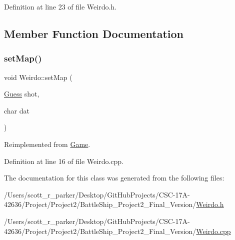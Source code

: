 Definition at line 23 of file Weirdo.\+h.



\subsection{Member Function Documentation}
\mbox{\label{class_weirdo_aa71d633becb93a3d1b6273f5b0a8dc14}} 
\subsubsection{\texorpdfstring{set\+Map()}{setMap()}}
{\footnotesize\ttfamily void Weirdo\+::set\+Map (\begin{DoxyParamCaption}\item[{\hyperlink{class_guess}{Guess}}]{shot,  }\item[{char}]{dat }\end{DoxyParamCaption})\hspace{0.3cm}{\ttfamily [virtual]}}



Reimplemented from \hyperlink{class_game_a4e23ede628f25d35813322e4e3f46b01}{Game}.



Definition at line 16 of file Weirdo.\+cpp.



The documentation for this class was generated from the following files\+:\begin{DoxyCompactItemize}
\item 
/\+Users/scott\+\_\+r\+\_\+parker/\+Desktop/\+Git\+Hub\+Projects/\+C\+S\+C-\/17\+A-\/42636/\+Project/\+Project2/\+Battle\+Ship\+\_\+\+Project2\+\_\+\+Final\+\_\+\+Version/\hyperlink{_weirdo_8h}{Weirdo.\+h}\item 
/\+Users/scott\+\_\+r\+\_\+parker/\+Desktop/\+Git\+Hub\+Projects/\+C\+S\+C-\/17\+A-\/42636/\+Project/\+Project2/\+Battle\+Ship\+\_\+\+Project2\+\_\+\+Final\+\_\+\+Version/\hyperlink{_weirdo_8cpp}{Weirdo.\+cpp}\end{DoxyCompactItemize}
